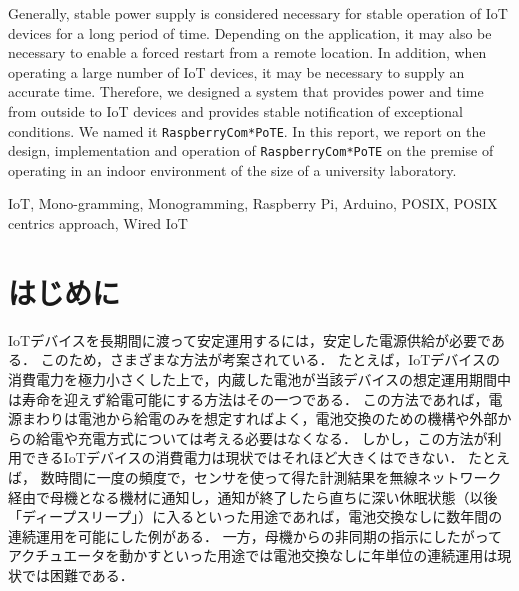 \begin{eabstract}
Generally, stable power supply is considered necessary for stable operation of IoT devices for a long period of time.
Depending on the application, it may also be necessary to enable a forced restart from a remote location.
In addition, when operating a large number of IoT devices, it may be necessary to supply an accurate time.
Therefore, we designed a system that provides power and time from outside to IoT devices and provides stable notification of exceptional conditions. We named it {\tt Raspberry\-Com*PoTE}.
In this report, we report on the design, implementation and operation of {\tt Raspberry\-Com*PoTE} on the premise of operating in an indoor environment of the size of a university laboratory.

\end{eabstract}

\begin{ekeyword}
IoT, Mono-gramming, Monogramming, Raspberry Pi, Arduino, POSIX, POSIX centrics approach, Wired IoT
\end{ekeyword}

\maketitle




\section{はじめに}
\label{sec:01introduction}

IoTデバイスを長期間に渡って安定運用するには，安定した電源供給が必要である．
このため，さまざまな方法が考案されている．
たとえば，IoTデバイスの消費電力を極力小さくした上で，内蔵した電池が当該デバイスの想定運用期間中は寿命を迎えず給電可能にする方法はその一つである．
この方法であれば，電源まわりは電池から給電のみを想定すればよく，電池交換のための機構や外部からの給電や充電方式については考える必要はなくなる．
しかし，この方法が利用できるIoTデバイスの消費電力は現状ではそれほど大きくはできない．
たとえば，
数時間に一度の頻度で，センサを使って得た計測結果を無線ネットワーク経由で母機となる機材に通知し，通知が終了したら直ちに深い休眠状態（以後「ディープスリープ」）に入るといった用途であれば，電池交換なしに数年間の連続運用を可能にした例がある．
一方，母機からの非同期の指示にしたがってアクチュエータを動かすといった用途では電池交換なしに年単位の連続運用は現状では困難である．

